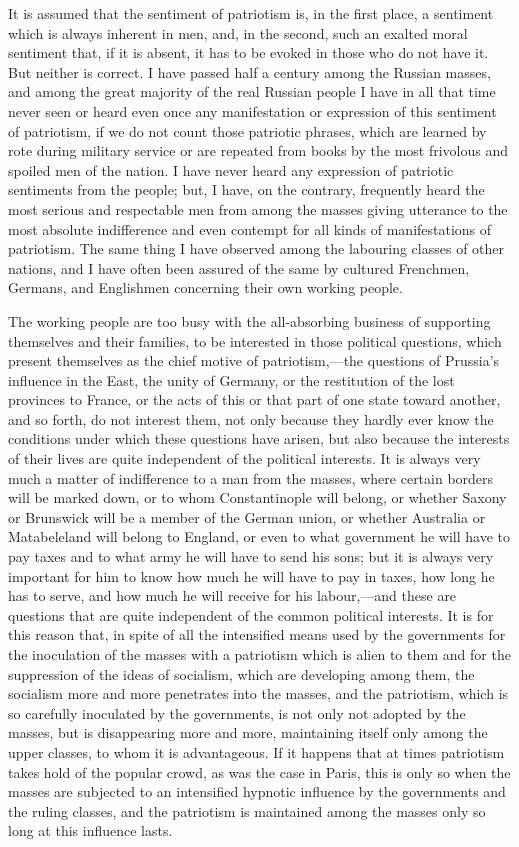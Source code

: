\documentclass{book}
\begin{document}
It is assumed that the sentiment of patriotism is, in the first place, a sentiment which is always inherent in men, and, in the second, such an exalted moral sentiment that, if it is absent, it has to be evoked in those who do not have it. But neither is correct. I have passed half a century among the Russian masses, and among the great majority of the real Russian people I have in all that time never seen or heard even once any manifestation or expression of this sentiment of patriotism, if we do not count those patriotic phrases, which are learned by rote during military service or are repeated from books by the most frivolous and spoiled men of the nation. I have never heard any expression of patriotic sentiments from the people; but, I have, on the contrary, frequently heard the most serious and respectable men from among the masses giving utterance to the most absolute indifference and even contempt for all kinds of manifestations of patriotism. The same thing I have observed among the labouring classes of other nations, and I have often been assured of the same by cultured Frenchmen, Germans, and Englishmen concerning their own working people.

The working people are too busy with the all-absorbing business of supporting themselves and their families, to be interested in those political questions, which present themselves as the chief motive of patriotism,—the questions of Prussia’s influence in the East, the unity of Germany, or the restitution of the lost provinces to France, or the acts of this or that part of one state toward another, and so forth, do not interest them, not only because they hardly ever know the conditions under which these questions have arisen, but also because the interests of their lives are quite independent of the political interests. It is always very much a matter of indifference to a man from the masses, where certain borders will be marked down, or to whom Constantinople will belong, or whether Saxony or Brunswick will be a member of the German union, or whether Australia or Matabeleland will belong to England, or even to what government he will have to pay taxes and to what army he will have to send his sons; but it is always very important for him to know how much he will have to pay in taxes, how long he has to serve, and how much he will receive for his labour,—and these are questions that are quite independent of the common political interests. It is for this reason that, in spite of all the intensified means used by the governments for the inoculation of the masses with a patriotism which is alien to them and for the suppression of the ideas of socialism, which are developing among them, the socialism more and more penetrates into the masses, and the patriotism, which is so carefully inoculated by the governments, is not only not adopted by the masses, but is disappearing more and more, maintaining itself only among the upper classes, to whom it is advantageous. If it happens that at times patriotism takes hold of the popular crowd, as was the case in Paris, this is only so when the masses are subjected to an intensified hypnotic influence by the governments and the ruling classes, and the patriotism is maintained among the masses only so long at this influence lasts.
\end{document}
